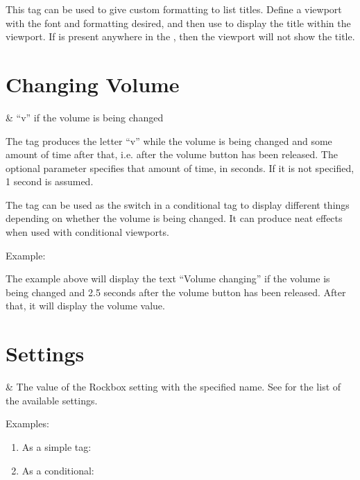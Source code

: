   This tag can be used to give custom formatting to list titles.
  Define a viewport with the font and formatting desired, and then use
   to display the title within the
  viewport.  If  is present anywhere in the , then the
   viewport will not show the title.

\section{Changing Volume}
  \begin{tagmap}
     & ``v'' if the volume is being changed\\
  \end{tagmap}

The tag produces the letter ``v'' while the volume is being changed and some
amount of time after that, i.e. after the volume button has been released. The
optional parameter  specifies that amount of time, in seconds. If it
is not specified, 1 second is assumed.

The tag can be used as the switch in a conditional tag to display different things
depending on whether the volume is being changed. It can produce neat effects
when used with conditional viewports.

Example: 

The example above will display the text ``Volume changing'' if the volume is
being changed and 2.5 seconds after the volume button has been released. After
that, it will display the volume value.

\section{Settings}
  \begin{tagmap}
     & The value of the Rockbox
             setting with the specified name. See 
             for the list of the available settings.\\
  \end{tagmap}

Examples:
\begin{enumerate}
\item As a simple tag: 
\item As a conditional: 
\end{enumerate}


